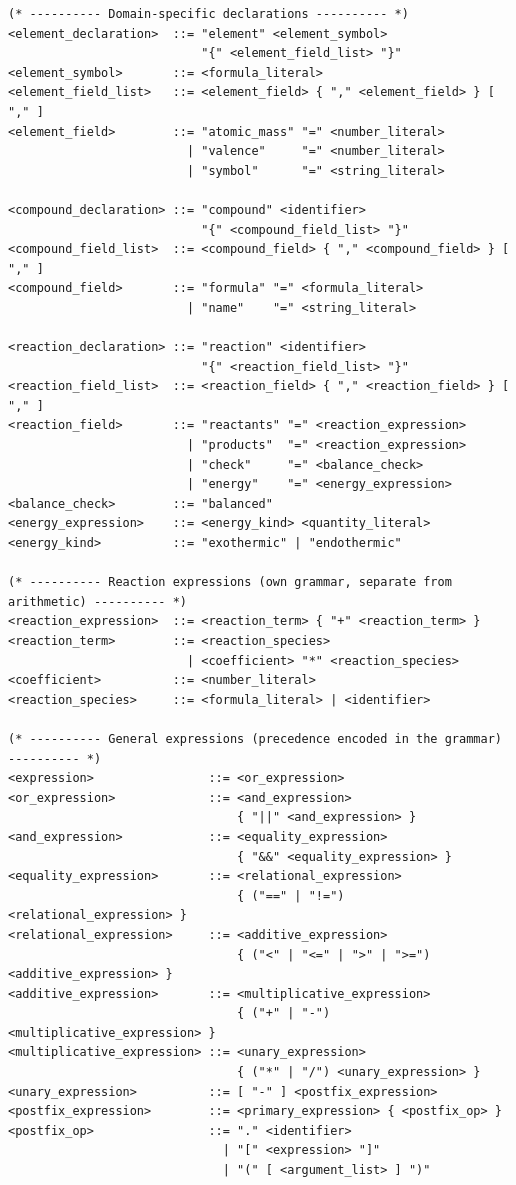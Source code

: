 \documentclass[11pt,a4paper]{article}
\begin{document}
\begin{lstlisting}[style=ebnf]
(* ---------- Domain-specific declarations ---------- *)
<element_declaration>  ::= "element" <element_symbol>
                           "{" <element_field_list> "}"
<element_symbol>       ::= <formula_literal>
<element_field_list>   ::= <element_field> { "," <element_field> } [ "," ]
<element_field>        ::= "atomic_mass" "=" <number_literal>
                         | "valence"     "=" <number_literal>
                         | "symbol"      "=" <string_literal>

<compound_declaration> ::= "compound" <identifier>
                           "{" <compound_field_list> "}"
<compound_field_list>  ::= <compound_field> { "," <compound_field> } [ "," ]
<compound_field>       ::= "formula" "=" <formula_literal>
                         | "name"    "=" <string_literal>

<reaction_declaration> ::= "reaction" <identifier>
                           "{" <reaction_field_list> "}"
<reaction_field_list>  ::= <reaction_field> { "," <reaction_field> } [ "," ]
<reaction_field>       ::= "reactants" "=" <reaction_expression>
                         | "products"  "=" <reaction_expression>
                         | "check"     "=" <balance_check>
                         | "energy"    "=" <energy_expression>
<balance_check>        ::= "balanced"
<energy_expression>    ::= <energy_kind> <quantity_literal>
<energy_kind>          ::= "exothermic" | "endothermic"

(* ---------- Reaction expressions (own grammar, separate from arithmetic) ---------- *)
<reaction_expression>  ::= <reaction_term> { "+" <reaction_term> }
<reaction_term>        ::= <reaction_species>
                         | <coefficient> "*" <reaction_species>
<coefficient>          ::= <number_literal>
<reaction_species>     ::= <formula_literal> | <identifier>

(* ---------- General expressions (precedence encoded in the grammar) ---------- *)
<expression>                ::= <or_expression>
<or_expression>             ::= <and_expression>
                                { "||" <and_expression> }
<and_expression>            ::= <equality_expression>
                                { "&&" <equality_expression> }
<equality_expression>       ::= <relational_expression>
                                { ("==" | "!=") <relational_expression> }
<relational_expression>     ::= <additive_expression>
                                { ("<" | "<=" | ">" | ">=") <additive_expression> }
<additive_expression>       ::= <multiplicative_expression>
                                { ("+" | "-") <multiplicative_expression> }
<multiplicative_expression> ::= <unary_expression>
                                { ("*" | "/") <unary_expression> }
<unary_expression>          ::= [ "-" ] <postfix_expression>
<postfix_expression>        ::= <primary_expression> { <postfix_op> }
<postfix_op>                ::= "." <identifier>
                              | "[" <expression> "]"
                              | "(" [ <argument_list> ] ")"


\end{lstlisting}
\end{document}
